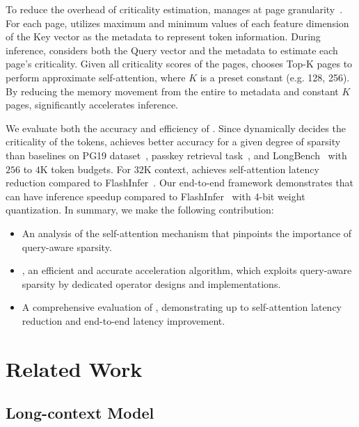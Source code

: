 To reduce the overhead of \kvc{} criticality estimation, \method{} manages \kvc{} at page granularity~\cite{kwon2023efficient}. For each page, \method{} utilizes maximum and minimum values of each feature dimension of the Key vector as the metadata to represent token information. During inference, \method{} considers both the Query vector and the metadata to estimate each page's criticality. Given all criticality scores of the pages, \method{} chooses Top-K pages to perform approximate self-attention, where $K$ is a preset constant (e.g.  128, 256). By reducing the memory movement from the entire \kvc{} to metadata and constant $K$ pages, \method{} significantly accelerates inference.

We evaluate both the accuracy and efficiency of \method{}. Since \method{} dynamically decides the criticality of the tokens, \method{} achieves better accuracy for a given degree of \kvc{} sparsity than baselines on PG19 dataset~\cite{raecompressive2019}, passkey retrieval task~\cite{peng2023yarn}, and LongBench~\cite{bai2023longbench} with $256$ to $4$K token budgets.  For $32$K context, \method{} achieves \selfspeedup self-attention latency reduction compared to FlashInfer~\cite{flashinfer}. Our end-to-end framework demonstrates that \method{} can have \eespeedup inference speedup compared to FlashInfer~\cite{flashinfer} with 4-bit weight quantization. In summary, we make the following contribution:

\vspace{-10pt}
\begin{itemize}
    \setlength{\itemsep}{-3pt}
    \item An analysis of the self-attention mechanism that pinpoints the importance of query-aware sparsity.
    \item \method, an efficient and accurate \kvc{} acceleration algorithm, which exploits query-aware sparsity by dedicated operator designs and implementations.
    \item A comprehensive evaluation of \method, demonstrating up to \selfspeedup self-attention latency reduction and \eespeedup end-to-end latency improvement.
\end{itemize}
\section{Related Work}

\subsection{Long-context Model}

